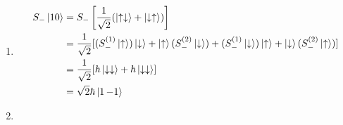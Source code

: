 \documentclass{article}
\begin{document}
\subsection{}

\begin{enumerate}
  \item

        \begin{align*}
          S_- \ket{1 0} & = S_- \left[ \frac{1}{\sqrt{2}} (\ket{\uparrow \downarrow} + \ket{\downarrow \uparrow}) \right]                                                                                                              \\
                        & = \frac{1}{\sqrt{2}} [(S_-^{(1)} \ket{\uparrow}) \ket{\downarrow} + \ket{\uparrow} (S_-^{(2)} \ket{\downarrow}) + (S_-^{(1)} \ket{\downarrow}) \ket{\uparrow} + \ket{\downarrow} (S_-^{(2)} \ket{\uparrow})] \\
                        & = \frac{1}{\sqrt{2}} [\hbar \ket{\downarrow \downarrow} + \hbar \ket{\downarrow \downarrow}]                                                                                                                 \\
                        & = \sqrt{2} \hbar \ket{1 \,{-1}}
        \end{align*}

  \item


\end{enumerate}
\end{document}

